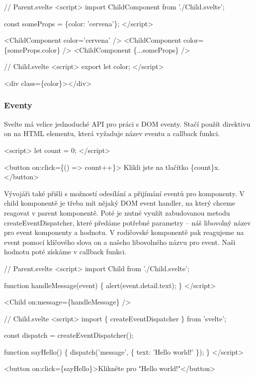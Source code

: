 \begin{prog}
// Parent.svelte
<script>
  import ChildComponent from './Child.svelte';

  const someProps = \{color: 'cervena'\};
</script>

<ChildComponent color='cervena' />
<ChildComponent color=\{someProps.color\} />
<ChildComponent \{...someProps\} />

// Child.svelte
<script>
  export let color;
</script>

<div class=\{color\}></div>
\end{prog}

\subsubsection{Eventy}

Svelte má velice jednoduché API pro práci s DOM eventy. Stačí použít direktivu on na HTML elementu, která vyžaduje název eventu a callback funkci.

\begin{prog}
<script>
  let count = 0;
</script>

<button on:click=\{() => count++\}>
  Klikli jste na tlačítko \{count\}x.
</button>
\end{prog}

Vývojáři také přišli s možností odesílání a přijímání eventů pro komponenty. 
V child komponentě je třeba mít nějaký DOM event handler, na který chceme reagovat v parent komponentě. 
Poté je nutné využít zabudovanou metodu createEventDispatcher, které předáme potřebné parametry -- náš libovolný název pro event komponenty a hodnotu. 
V rodičovské komponentě pak reagujeme na event pomocí klíčového slova on a našeho libovolného názvu pro event. Naši hodnotu poté získáme v callback funkci.\cite{sveltehandbook,svelte}

\begin{prog}
// Parent.svelte
<script>
  import Child from './Child.svelte';

  function handleMessage(event) \{
    alert(event.detail.text);
  \}
</script>

<Child on:message=\{handleMessage\} />

// Child.svelte
<script>
  import \{ createEventDispatcher \} from 'svelte';

  const dispatch = createEventDispatcher();

  function sayHello() \{
    dispatch('message', \{
      text: 'Hello world!'
    \});
  \}
</script>

<button on:click=\{sayHello\}>Klikněte pro "Hello world!"</button>
\end{prog}

